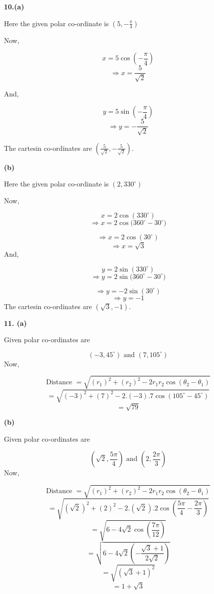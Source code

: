\documentclass{article}
\begin{document}
\begin{flushleft}
\textbf{10.\hspace{0.4cm}(a)}\par
\vspace{0.5cm}
Here the given polar co-ordinate is $(5,-\frac{\pi}{4})$\par
Now,\par
\[x=5 \cos{(-\frac{\pi}{4})}\]
\[\Longrightarrow x = \frac{5}{\sqrt{2}}\]\par
And,\par
\[y=5\sin{(-\frac{\pi}{4})}\]
\[\Longrightarrow y = -\frac{5}{\sqrt{2}}\]\par
The cartesin co-ordinates are $(\frac{5}{\sqrt{2}},-\frac{5}{\sqrt{2}})$.\par
\newpage
\textbf{\hspace{1cm}(b)}\par
Here the given polar co-ordinate is $(2, 330^{\circ})$\par
Now,\par
\[x=2 \cos{(330^{\circ})}\]
\[\Longrightarrow x = 2\cos{(360^{\circ}-30^{\circ}})\]\par
\[\Longrightarrow x = 2 \cos{(30^{\circ})}\]
\[\Longrightarrow x = \sqrt{3}\]
And,\par
\[y=2 \sin{(330^{\circ})}\]
\[\Longrightarrow y = 2\sin{(360^{\circ}-30^{\circ}})\]\par
\[\Longrightarrow y = -2 \sin{(30^{\circ})}\]
\[\Longrightarrow y = -1 \]
The cartesin co-ordinates are $(\sqrt{3},-1)$.\par
\vspace{1cm}

\textbf{11. \hspace{0.4cm}(a)}\par
\vspace{0.5cm}
Given polar co-ordinates are\par
\[(-3, 45^{\circ}) \text { and } (7, 105^{\circ})\]
Now,\par
\[\text{Distance }= \sqrt{(r_1)^{2}+(r_2)^{2}-2r_1 r_2 \cos{(\theta_2 -\theta_1)}}\]
\[=\sqrt{(-3)^{2}+(7)^{2}-2.(-3).7\cos{(105^{\circ}-45^{\circ})}}\]
\[=\sqrt{79}\]\par
\vspace{1cm}
\textbf{\hspace{1cm}(b)}\par
\vspace{0.5cm}
Given polar co-ordinates are\par
\[(\sqrt{2}, \frac{5\pi}{4} ) \text { and } (2, \frac{2\pi}{3})\]
Now,\par
\[\text{Distance }= \sqrt{(r_1)^{2}+(r_2)^{2}-2r_1 r_2 \cos{(\theta_2 -\theta_1)}}\]
\[=\sqrt{(\sqrt{2})^{2}+(2)^{2}-2.(\sqrt{2}).2\cos{(\frac{5\pi}{4}-\frac{2\pi}{3})}}\]
\[=\sqrt{6-4\sqrt{2}\cos{(\frac{7\pi}{12})}}\]
\[=\sqrt{6-4\sqrt{2}(-\frac{\sqrt{3}+1}{2\sqrt{2}})}\]
\[=\sqrt{(\sqrt{3}+1)^{2}}\]
\[=1+\sqrt{3}\]\par
\newpage


\end{flushleft}
\end{document}
